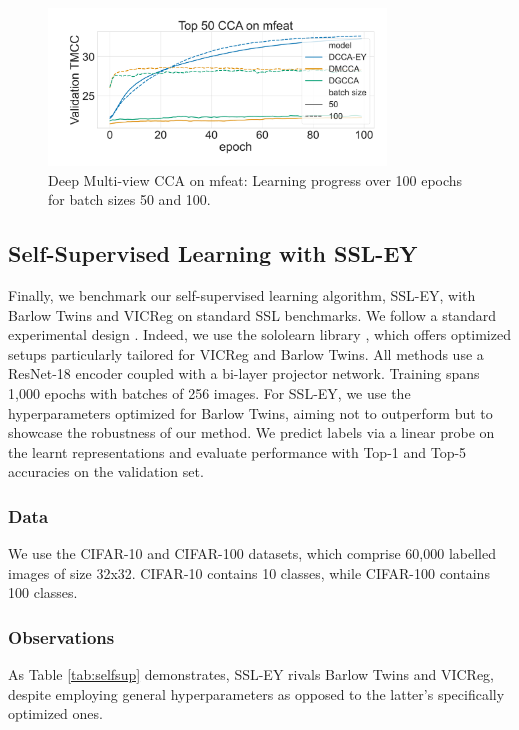 \begin{figure}
    \centering
    \includegraphics[width=0.8\textwidth]{figures/DMCCA/mfeat_allbatchsizes_pcc}
    \caption{Deep Multi-view CCA on mfeat: Learning progress over 100 epochs for batch sizes 50 and 100.}\label{fig:dmcca_lr}
\end{figure}

\subsection{Self-Supervised Learning with SSL-EY}
Finally, we benchmark our self-supervised learning algorithm, SSL-EY, with Barlow Twins and VICReg on standard SSL benchmarks.
We follow a standard experimental design \citep{tong2023emp}.
Indeed, we use the sololearn library \citep{da2022solo}, which offers optimized setups particularly tailored for VICReg and Barlow Twins.
All methods use a ResNet-18 encoder coupled with a bi-layer projector network.
Training spans 1,000 epochs with batches of 256 images.
For SSL-EY, we use the hyperparameters optimized for Barlow Twins, aiming not to outperform but to showcase the robustness of our method.
We predict labels via a linear probe on the learnt representations and evaluate performance with Top-1 and Top-5 accuracies on the validation set.

\subsubsection{Data} We use the CIFAR-10 and CIFAR-100 datasets, which comprise 60,000 labelled images of size 32x32.
CIFAR-10 contains 10 classes, while CIFAR-100 contains 100 classes.

\subsubsection{Observations} As Table \ref{tab:selfsup} demonstrates, SSL-EY rivals Barlow Twins and VICReg, despite employing general hyperparameters as opposed to the latter's specifically optimized ones.

